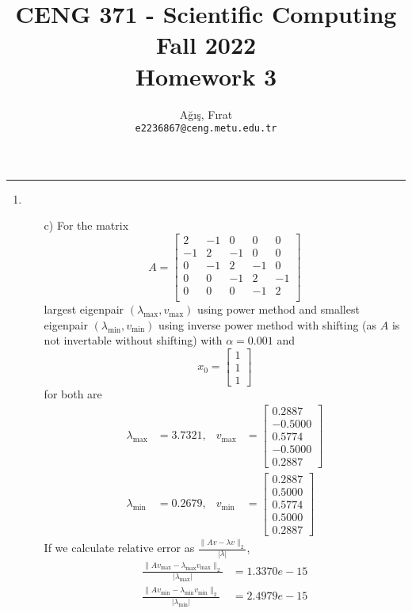 \documentclass[10pt,a4paper, margin=1in]{article}
\author{
  Ağış, Fırat\\
  \texttt{e2236867@ceng.metu.edu.tr}
}
\title{CENG 371 - Scientific Computing \\
Fall 2022 \\
Homework 3}
\begin{document}
\maketitle

\noindent\rule{19cm}{1.2pt}

\begin{enumerate}
    \item %
    \begin{enumerate}
    	\item[c)]For the matrix $$A = \begin{bmatrix}
    	2&-1&0&0&0\\
    	-1&2&-1&0&0\\
    	0&-1&2&-1&0\\
    	0&0&-1&2&-1\\
    	0&0&0&-1&2\\
    	\end{bmatrix}$$
    	largest eigenpair $(\lambda_{\text{max}},v_{\text{max}})$ using power method and smallest eigenpair $(\lambda_{\text{min}},v_{\text{min}})$ using inverse power method with shifting (as $A$ is not invertable without shifting) with $\alpha=0.001$ and $$x_0=\begin{bmatrix} 1\\1\\1 \end{bmatrix}$$ for both are
    	\begin{align*}
    		\lambda_{\text{max}} &= 3.7321, &v_{\text{max}} &=  \begin{bmatrix}0.2887\\ -0.5000\\0.5774\\-0.5000\\0.2887\end{bmatrix}\\
    		\lambda_{\text{min}} &= 0.2679, &v_{\text{min}} &=  \begin{bmatrix}0.2887\\ 0.5000\\0.5774\\0.5000\\0.2887\end{bmatrix}
    	\end{align*}
    	If we calculate relative error as $\frac{\|Av-\lambda v\|_2}{|\lambda |}$,
    	\begin{align*}
    		\frac{\|Av_{\text{max}}-\lambda_{\text{max}} v_{\text{max}}\|_2}{|\lambda_{\text{max}} |} &= 1.3370e-15\\
    		\frac{\|Av_{\text{min}}-\lambda_{\text{min}} v_{\text{min}}\|_2}{|\lambda_{\text{min}} |} &= 2.4979e-15

\end{align*}
\end{enumerate}
\end{enumerate}
\end{document}
